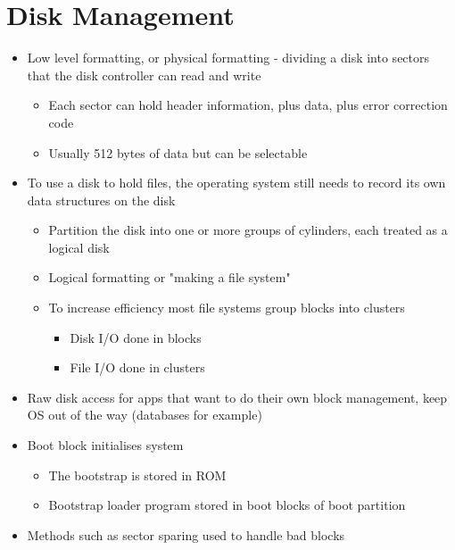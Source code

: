 \documentclass{article}[18pt]
\begin{document}
\section{Disk Management}
\begin{itemize}
	\item Low level formatting, or physical formatting - dividing a disk into sectors that the disk controller can read and write
	\begin{itemize}
		\item Each sector can hold header information, plus data, plus error correction code
		\item Usually 512 bytes of data but can be selectable
	\end{itemize}
	\item To use a disk to hold files, the operating system still needs to record its own data structures on the disk
	\begin{itemize}
		\item Partition the disk into one or more groups of cylinders, each treated as a logical disk
		\item Logical formatting or "making a file system"
		\item To increase efficiency most file systems group blocks into clusters
		\begin{itemize}
			\item Disk I/O done in blocks
			\item File I/O done in clusters
		\end{itemize}
	\end{itemize}
	\item Raw disk access for apps that want to do their own block management, keep OS out of the way (databases for example)
	\item Boot block initialises system
	\begin{itemize}
		\item The bootstrap is stored in ROM
		\item Bootstrap loader program stored in boot blocks of boot partition
	\end{itemize}
	\item Methods such as sector sparing used to handle bad blocks
\end{itemize}
\end{document}

